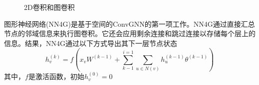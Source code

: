 \begin{figure}[htbp]
	\centering 
	\caption{2D卷积和图卷积}
	\label{fig:2DConvs_GConvs}  
\end{figure}	

图形神经网络(NN4G)是基于空间的ConvGNN的第一项工作。NN4G通过直接汇总节点的邻域信息来执行图卷积。它还会应用剩余连接和跳过连接以存储每个层上的信息。结果，NN4G通过以下方式导出其下一层节点状态 
\[
h_v^{(k)}=f(x_vW^{(k-1)}+\sum_{k-1}^{i=1}\sum_{u\in N(v)}h_u^{(k-1)}\theta^{(k-1)})
\]
其中，$f$是激活函数，初始$h_v^{(0)}=0$

